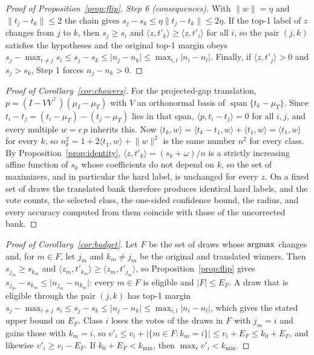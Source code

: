 \begin{proof}[Proof of Proposition~\ref{prop:flip}]
\emph{Step 6 (consequences).} With $\lVert w\rVert=\eta$ and
$\lVert t_j-t_k\rVert\le2$ the chain gives
$s_j-s_k\le\eta\lVert t_j-t_k\rVert\le2\eta$. If the top-1 label of $z$
changes from $j$ to $k$, then $s_j\ge s_i$ and
$\langle z,t'_k\rangle\ge\langle z,t'_i\rangle$ for all $i$, so the pair
$(j,k)$ satisfies the hypotheses and the original top-1 margin obeys
$s_j-\max_{i\ne j}s_i\le s_j-s_k\le\lvert n_j-n_k\rvert
\le\max_{i,l}\lvert n_i-n_l\rvert$. Finally, if $\langle z,t'_j\rangle>0$ and
$s_j>s_k$, Step 1 forces $n_j-n_k>0$.
\end{proof}

\begin{proof}[Proof of Corollary~\ref{cor:chowers}]
For the projected-gap translation, $p=(I-VV^{\top})(\mu_I-\mu_T)$ with $V$ an
orthonormal basis of $\operatorname{span}\{t_k-\mu_T\}$. Since
$t_i-t_j=(t_i-\mu_T)-(t_j-\mu_T)$ lies in that span,
$\langle p,t_i-t_j\rangle=0$ for all $i,j$, and every multiple $w=c\,p$
inherits this. Now
$\langle t_k,w\rangle=\langle t_k-t_1,w\rangle+\langle t_1,w\rangle
=\langle t_1,w\rangle$ for every $k$, so
$n_k^2=1+2\langle t_1,w\rangle+\lVert w\rVert^2$ is the same number $n^2$ for
every class. By Proposition~\ref{prop:identity},
$\langle z,t'_k\rangle=(s_k+\omega)/n$ is a strictly increasing affine function of
$s_k$ whose coefficients do not depend on $k$, so the set of maximizers, and
in particular the hard label, is unchanged for every $z$. On a fixed set of
draws the translated bank therefore produces identical hard labels, and the
vote counts, the selected class, the one-sided confidence bound, the radius,
and every accuracy computed from them coincide with those of the uncorrected
bank.
\end{proof}

\begin{proof}[Proof of Corollary~\ref{cor:budget}]
Let $F$ be the set of draws whose $\operatorname{argmax}$ changes and, for $m\in F$, let
$j_m$ and $k_m\ne j_m$ be the original and translated winners. Then
$s_{j_m}\ge s_{k_m}$ and
$\langle z_m,t'_{k_m}\rangle\ge\langle z_m,t'_{j_m}\rangle$, so
Proposition~\ref{prop:flip} gives
$s_{j_m}-s_{k_m}\le\lvert n_{j_m}-n_{k_m}\rvert$: every $m\in F$ is eligible
and $\lvert F\rvert\le E_F$. A draw that is eligible through the pair $(j,k)$
has top-1 margin $s_j-\max_{i\ne j}s_i\le s_j-s_k\le\lvert n_j-n_k\rvert
\le\max_{i,l}\lvert n_i-n_l\rvert$, which gives the stated upper bound on
$E_F$. Class $i$ loses the votes of the draws in $F$ with $j_m=i$ and gains
those with $k_m=i$, so
$v'_i\le v_i+\lvert\{m\in F:k_m=i\}\rvert\le v_i+E_F\le k_0+E_F$, and likewise
$v'_i\ge v_i-E_F$. If $k_0+E_F<k_{\min}$, then $\max_i v'_i<k_{\min}$.
\end{proof}

